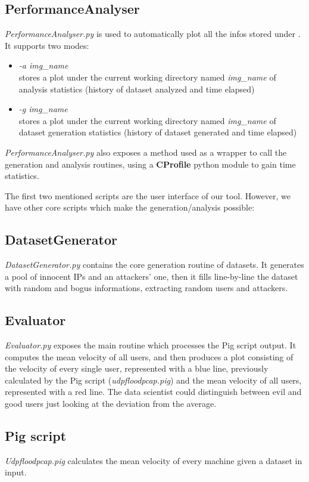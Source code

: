 \subsection{PerformanceAnalyser}
\textit{PerformanceAnalyser.py} is used to automatically plot all the infos stored under . It supports two modes:
	\begin{itemize}
		\item \textit{-a img\_name} \\ stores a plot under the current working directory named \textit{img\_name} of analysis statistics (history of dataset analyzed and time elapsed)
		\item \textit{-g img\_name} \\ stores a plot under the current working directory named \textit{img\_name} of dataset generation statistics (history of dataset generated and time elapsed)
	\end{itemize}

\textit{PerformanceAnalyser.py} also exposes a method used as a wrapper to call the generation and analysis routines, using a \textbf{CProfile} python module to gain time statistics.

\bigskip
The first two mentioned scripts are the user interface of our tool. However, we have other core scripts which make the generation/analysis possible:

\subsection{DatasetGenerator}
\textit{DatasetGenerator.py} contains the core generation routine of datasets. It generates a pool of innocent IPs and an attackers' one, then it fills line-by-line the dataset with random and bogus informations, extracting random users and attackers.

\subsection{Evaluator} 
\textit{Evaluator.py} exposes the main routine which processes the Pig script output. It computes the mean velocity of all users, and then produces a plot consisting of the velocity of every single user, represented with a blue line, previously calculated by the Pig script (\textit{udpfloodpcap.pig}) and the mean velocity of all users, represented with a red line. The data scientist could distinguish between evil and good users just looking at the deviation from the average.

\subsection{Pig script}
\textit{Udpfloodpcap.pig} calculates the mean velocity of every machine given a dataset in input.
